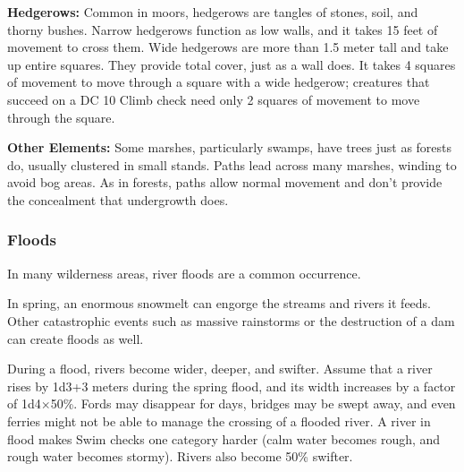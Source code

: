 \textbf{Hedgerows:} Common in moors, hedgerows are tangles of stones, soil, and thorny bushes. Narrow hedgerows function as low walls, and it takes 15 feet of movement to cross them. Wide hedgerows are more than 1.5 meter tall and take up entire squares. They provide total cover, just as a wall does. It takes 4 squares of movement to move through a square with a wide hedgerow; creatures that succeed on a DC 10 Climb check need only 2 squares of movement to move through the square.


\textbf{Other Elements:} Some marshes, particularly swamps, have trees just as forests do, usually clustered in small stands. Paths lead across many marshes, winding to avoid bog areas. As in forests, paths allow normal movement and don't provide the concealment that undergrowth does.



\subsubsection{Floods}
In many wilderness areas, river floods are a common occurrence.

In spring, an enormous snowmelt can engorge the streams and rivers it feeds. Other catastrophic events such as massive rainstorms or the destruction of a dam can create floods as well.

During a flood, rivers become wider, deeper, and swifter. Assume that a river rises by 1d3+3 meters during the spring flood, and its width increases by a factor of 1d4$\times$50\%. Fords may disappear for days, bridges may be swept away, and even ferries might not be able to manage the crossing of a flooded river. A river in flood makes Swim checks one category harder (calm water becomes rough, and rough water becomes stormy). Rivers also become 50\% swifter.

